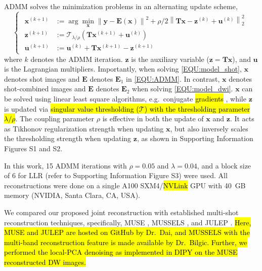 \documentclass[preprint,12pt,authoryear,review]{elsarticle}
\newcommand*{\norm}[1]{\left\lVert#1\right\rVert}
\newcommand{\argmin}{\arg\!\min}
\begin{document}
    ADMM solves the minimization problems in an alternating update scheme,
    \begin{equation}
        \left\{\begin{matrix}
            \begin{aligned}
                \mathbf{x}^{(k+1)} &:= \argmin_{\mathbf{x}} \norm{\mathbf{y} - \mathbf{E}(\mathbf{x})}^2 + \rho/2 \norm{\mathbf{T}\mathbf{x} - \mathbf{z}^{(k)} + \mathbf{u}^{(k)}}_2^2 \\
                \mathbf{z}^{(k+1)} &:= \mathcal{T}_{\lambda/\rho} (\mathbf{T} \mathbf{x}^{(k+1)} + \mathbf{u}^{(k)}) \\
                \mathbf{u}^{(k+1)} &:= \mathbf{u}^{(k)} + \mathbf{T} \mathbf{x}^{(k+1)} - \mathbf{z}^{(k+1)}
            \end{aligned}
        \end{matrix}\right.
        \label{EQU:ADMM}
    \end{equation}
    where $k$ denotes the ADMM iteration.
    $\mathbf{z}$ is the auxiliary variable ($\mathbf{z} = \mathbf{T}\mathbf{x}$),
    and $\textbf{u}$ is the Lagrangian multipliers.
    Importantly, when solving \cref{EQU:model_shot},
    $\textbf{x}$ denotes shot images and $\mathbf{E}$ denotes $\mathbf{E}_1$ in \cref{EQU:ADMM}.
    In contrast, $\textbf{x}$ denotes shot-combined images and $\mathbf{E}$ denotes $\mathbf{E}_2$
    when solving \cref{EQU:model_dwi}.
    $\mathbf{x}$ can be solved using linear least square algorithms, 
    e.g.~conjugate \hl{gradients} \citep{hestenes_1952_cg},
    while $\mathbf{z}$ is updated via \hl{singular value thresholding
    (\mbox{$\mathcal{T}$}) with the thresholding parameter \mbox{$\lambda / \rho$}}.
    The coupling parameter $\rho$ is effective in both the update of $\mathbf{x}$ and $\mathbf{z}$.
    It acts as Tikhonov regularization strength when updating $\mathbf{x}$,
    but also inversely scales the thresholding strength when updating $\mathbf{z}$,
    as shown in Supporting Information Figures S1 and S2.

    In this work, 15 ADMM iterations with $\rho = 0.05$ and $\lambda = 0.04$,
    and a block size of 6 for LLR (refer to Supporting Information Figure S3)
    were used.
    All reconstructions were done on a single A100 SXM4/\hl{NVLink} GPU 
    with \SI{40}{GB} memory (NVIDIA, Santa Clara, CA, USA).

    We compared our proposed joint reconstruction
    with established multi-shot reconstruction techniques,
    specifically, MUSE \citep{chen_2013_muse},
    MUSSELS \citep{bilgic_2019_neatr},
    and JULEP \citep{dai_2023_julep}.
    \hl{Here, MUSE and JULEP are hosted on GitHub by Dr.~Dai,
    and MUSSELS with the multi-band reconstruction feature
    is made available by Dr.~Bilgic.
    Further, we performed
    the local-PCA denoising \mbox{\citep{manjon_2013_localpca}}
    as implemented in DIPY \mbox{\citep{garyfallidis_2014_dipy}}
    on the MUSE reconstructed DW images.}
\end{document}
